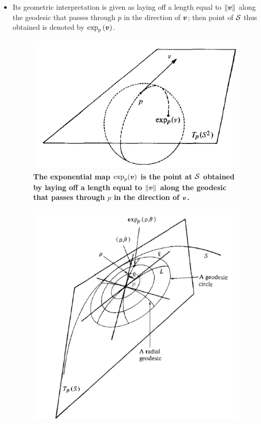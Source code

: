 \documentclass[11pt]{article}
\begin{document}
\begin{itemize}
\item Its geometric interpretation is given as laying off a length equal to $\left\|\boldsymbol{v}\right\|_{}$ along the geodesic that passes through $p$ in the direction of $\boldsymbol{v}$; then point of ${\mathcal S}$ thus obtained is denoted by $\exp_{p}\left(\boldsymbol{v}\right)$. 
\begin{figure}[htb]
\centering
\begin{minipage}{0.6\linewidth}
 \centerline{\includegraphics[scale = 0.4]{exp_map.png}}
\end{minipage}
\caption{\scriptsize
\textbf{The exponential map $\exp_{p}(\boldsymbol{v})$ is the point at ${\mathcal S}$ obtained by laying off a length equal to $\left\|\boldsymbol{v}\right\|_{}$ along the geodesic that passes through $p$ in the direction of $\boldsymbol{v}$.  }}
\end{figure}
\begin{figure}[htb]
\centering
\begin{minipage}{0.6\linewidth}
 \centerline{\includegraphics[scale = 0.4]{geo_polar_coord.png}}

\end{minipage}
\end{figure}
\end{itemize}
\end{document}
